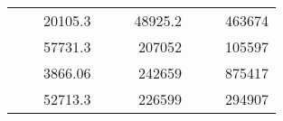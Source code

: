 \begin{table}[H]
\begin{tabular}{|ccrccrccc}
\rowcolor[HTML]{DDFDFF} 
\multicolumn{1}{|c|}{\cellcolor[HTML]{FFFFC7}}                                & \multicolumn{1}{c|}{\cellcolor[HTML]{DDFDFF}}                      & \multicolumn{1}{r|}{\cellcolor[HTML]{DAE8FC}20105.3}   & \multicolumn{1}{c|}{\cellcolor[HTML]{FFFFC7}}                                & \multicolumn{1}{c|}{\cellcolor[HTML]{DDFDFF}}                       & \multicolumn{1}{r|}{\cellcolor[HTML]{DDFDFF}48925.2}   & \multicolumn{1}{c|}{\cellcolor[HTML]{FFFFC7}}                                & \multicolumn{1}{c|}{\cellcolor[HTML]{DDFDFF}}                      & \multicolumn{1}{r|}{\cellcolor[HTML]{DDFDFF}463674}    \\ \cline{3-3} \cline{6-6} \cline{9-9} 
\multicolumn{1}{|c|}{\cellcolor[HTML]{FFFFC7}}                                & \multicolumn{1}{c|}{\cellcolor[HTML]{DDFDFF}}                      & \multicolumn{1}{r|}{\cellcolor[HTML]{DDFDFF}57731.3}   & \multicolumn{1}{c|}{\cellcolor[HTML]{FFFFC7}}                                & \multicolumn{1}{c|}{\cellcolor[HTML]{DDFDFF}}                       & \multicolumn{1}{r|}{\cellcolor[HTML]{DAE8FC}207052}    & \multicolumn{1}{c|}{\cellcolor[HTML]{FFFFC7}}                                & \multicolumn{1}{c|}{\cellcolor[HTML]{DDFDFF}}                      & \multicolumn{1}{r|}{\cellcolor[HTML]{DAE8FC}105597}    \\ \cline{3-3} \cline{6-6} \cline{9-9} 
\rowcolor[HTML]{DDFDFF} 
\multicolumn{1}{|c|}{\cellcolor[HTML]{FFFFC7}}                                & \multicolumn{1}{c|}{\cellcolor[HTML]{DDFDFF}}                      & \multicolumn{1}{r|}{\cellcolor[HTML]{DAE8FC}3866.06}   & \multicolumn{1}{c|}{\cellcolor[HTML]{FFFFC7}}                                & \multicolumn{1}{c|}{\cellcolor[HTML]{DDFDFF}}                       & \multicolumn{1}{r|}{\cellcolor[HTML]{DDFDFF}242659}    & \multicolumn{1}{c|}{\cellcolor[HTML]{FFFFC7}}                                & \multicolumn{1}{c|}{\cellcolor[HTML]{DDFDFF}}                      & \multicolumn{1}{r|}{\cellcolor[HTML]{DDFDFF}875417}    \\ \cline{3-3} \cline{6-6} \cline{9-9} 
\multicolumn{1}{|c|}{\cellcolor[HTML]{FFFFC7}}                                & \multicolumn{1}{c|}{\cellcolor[HTML]{DDFDFF}}                      & \multicolumn{1}{r|}{\cellcolor[HTML]{DDFDFF}52713.3}   & \multicolumn{1}{c|}{\cellcolor[HTML]{FFFFC7}}                                & \multicolumn{1}{c|}{\cellcolor[HTML]{DDFDFF}}                       & \multicolumn{1}{r|}{\cellcolor[HTML]{DAE8FC}226599}    & \multicolumn{1}{c|}{\cellcolor[HTML]{FFFFC7}}                                & \multicolumn{1}{c|}{\cellcolor[HTML]{DDFDFF}}                      & \multicolumn{1}{r|}{\cellcolor[HTML]{DAE8FC}294907}    \\ \cline{3-3} \cline{6-6} \cline{9-9} 

\end{tabular}
\end{table}
